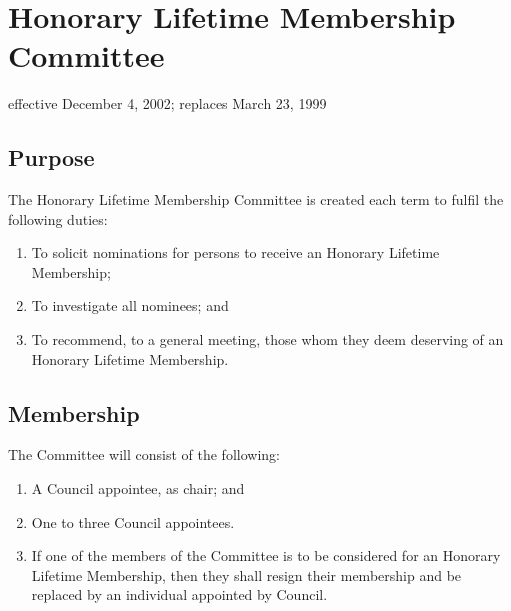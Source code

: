 \section{Honorary Lifetime Membership Committee}
effective December 4, 2002; replaces March 23, 1999

\subsection{Purpose}
The Honorary Lifetime Membership Committee is created each term to fulfil the following duties:
\begin{enumerate}
\item To solicit nominations for persons to receive an Honorary Lifetime Membership;
\item To investigate all nominees; and
\item To recommend, to a general meeting, those whom they deem deserving of an Honorary Lifetime Membership.
\end{enumerate}

\subsection{Membership}
The Committee will consist of the following:
\begin{enumerate}
\item A Council appointee, as chair; and
\item One to three Council appointees.
\item If one of the members of the Committee is to be considered for an Honorary Lifetime Membership, then they shall resign their membership and be replaced by an individual appointed by Council.
\end{enumerate}


